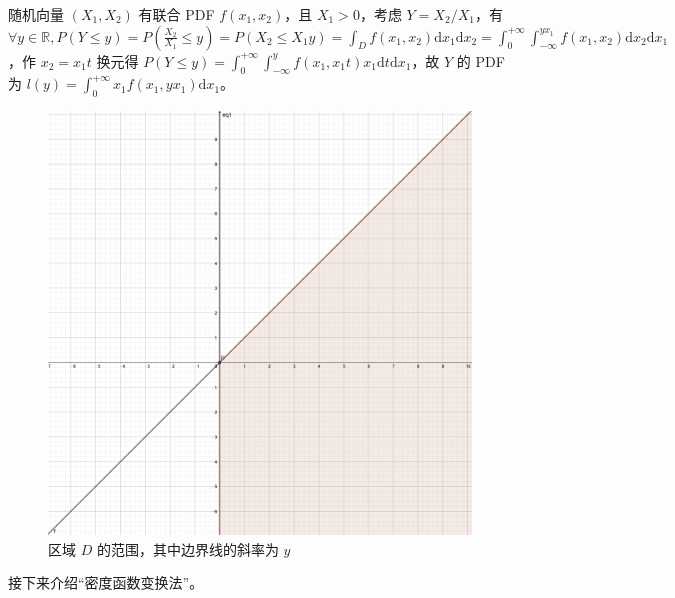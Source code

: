 \documentclass[../main.tex]{subfiles}
\begin{document}
\begin{example}
    随机向量 $(X_1,X_2)$ 有联合 PDF $f(x_1,x_2)$，且 $X_1>0$，考虑 $Y=X_2/X_1$，有 $\forall y\in\mathbb R,P(Y\leq y)=P(\frac{X_2}{X_1}\leq y)=P(X_2\leq X_1y)=\int_Df(x_1,x_2)\mathrm dx_1\mathrm dx_2=\int_0^{+\infty}\int_{-\infty}^{yx_1}f(x_1,x_2)\mathrm dx_2\mathrm dx_1$，作 $x_2=x_1t$ 换元得 $P(Y\leq y)=\int_0^{+\infty}\int_{-\infty}^yf(x_1,x_1t)x_1\mathrm dt\mathrm dx_1$，故 $Y$ 的 PDF 为 $l(y)=\int_0^{+\infty}x_1f(x_1,yx_1)\mathrm dx_1$。

    \begin{figure}[!h]
        \centering
        \includegraphics[scale=0.03]{figures/D_area.png}
        \caption{区域 $D$ 的范围，其中边界线的斜率为 $y$}
        \label{fig:3.7.1}
    \end{figure}

\end{example}

接下来介绍“密度函数变换法”。
\end{document}
